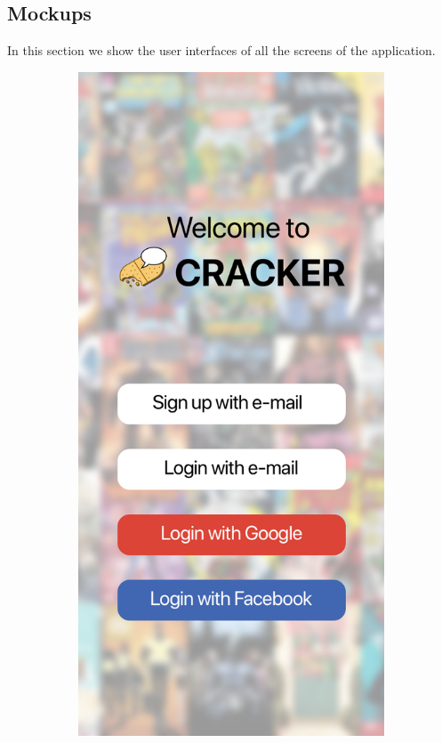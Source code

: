 \subsection{Mockups}
In this section we show the user interfaces of all the screens of the application. \newline

\vspace{28mm}

\begin{figure}[h]
  \begin{subfigure}[b]{0.4\textwidth}
    \includegraphics[width=\textwidth]{img/mockups/login}

\end{subfigure}
\end{figure}
